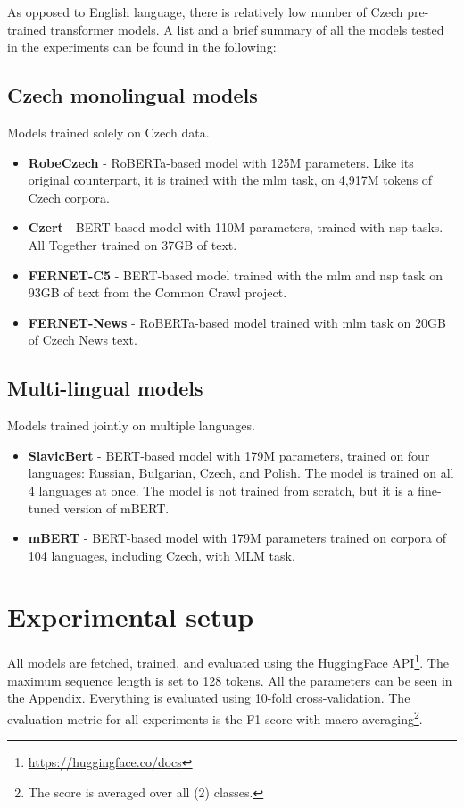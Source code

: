 As opposed to English language, there is relatively low number of Czech pre-trained transformer models. A list and a brief summary of all the models tested in the experiments can be found in the following:




\subsection{Czech monolingual models}
Models trained solely on Czech data.
\begin{itemize}
    \item \textbf{RobeCzech} \cite{strakarobeczech} - RoBERTa-based model with 125M parameters. Like its original counterpart, it is trained with the \gls{mlm} task, on 4,917M tokens of Czech corpora.
    \item \textbf{Czert} \cite{sido-etal-2021-czert} - BERT-based model with 110M parameters, trained with \gls{nsp} tasks. All Together trained on 37GB of text. 
    \item \textbf{FERNET-C5} \cite{lehevcka2021comparison} - BERT-based model trained with the \gls{mlm} and \gls{nsp} task on 93GB of text from the Common Crawl project.
    \item \textbf{FERNET-News} \cite{lehevcka2021comparison} - RoBERTa-based model trained with \gls{mlm} task on 20GB of Czech News text.
\end{itemize}




\subsection{Multi-lingual models}
Models trained jointly on multiple languages.
\begin{itemize}
    \item \textbf{SlavicBert} \cite{arkhipov2019tuning} - BERT-based model with 179M parameters, trained on four languages: Russian, Bulgarian, Czech, and Polish. The model is trained on all 4 languages at once. The model is not trained from scratch, but it is a fine-tuned version of mBERT.
    \item \textbf{mBERT} \cite{devlin2019bert} - BERT-based model with 179M parameters trained on corpora of 104 languages, including Czech, with MLM task.
\end{itemize}




\section{Experimental setup}
All models are fetched, trained, and evaluated using the HuggingFace API\footnote{\url{https://huggingface.co/docs}}. The maximum sequence length is set to 128 tokens. All the parameters can be seen in the Appendix.
Everything is evaluated using 10-fold cross-validation. The evaluation metric for all experiments is the F1 score with macro averaging\footnote{The score is averaged over all (2) classes.}. 

